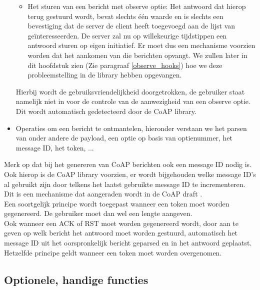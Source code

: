 \begin{itemize}
\begin{itemize}
\item Het sturen van een bericht met observe optie: Het antwoord dat hierop terug gestuurd wordt, bevat slechts \'{e}\'{e}n waarde en is slechts een bevestiging dat de server de client heeft toegevoegd aan de lijst van ge\"{i}nteresseerden. De server zal nu op willekeurige tijdstippen een antwoord sturen op eigen initiatief. Er moet dus een mechanisme voorzien worden dat het aankomen van die berichten opvangt. We zullen later in dit hoofdstuk zien (Zie paragraaf \ref{observe_hooks}) hoe we deze probleemstelling in de library hebben opgevangen.
\end{itemize}
Hierbij wordt de gebruiksvriendelijkheid doorgetrokken, de gebruiker staat namelijk niet in voor de controle van de aanwezigheid van een observe optie. Dit wordt automatisch gedetecteerd door de CoAP library.
\item Operaties om een bericht te ontmantelen, hieronder verstaan we het parsen van onder andere de payload, een optie op basis van optienummer, het message ID, het token, ...
\end{itemize}

Merk op dat bij het genereren van CoAP berichten ook een message ID nodig is. Ook hierop is de CoAP library voorzien, er wordt bijgehouden welke message ID's al gebruikt zijn door telkens het laatst gebruikte message ID te incrementeren. Dit is een mechanisme dat aangeraden wordt in de CoAP draft \cite{coapDraft}.\\
Een soortgelijk principe wordt toegepast wanneer een token moet worden gegenereerd. De gebruiker moet dan wel een lengte aangeven.\\
Ook wanneer een ACK of RST moet worden gegenereerd wordt, door aan te geven op welk bericht het antwoord moet worden gestuurd, automatisch het message ID uit het oorspronkelijk bericht geparsed en in het antwoord geplaatst. Hetzelfde principe geldt wanneer een token moet worden overgenomen.

\subsection{Optionele, handige functies} \label{optionelefuncties}

